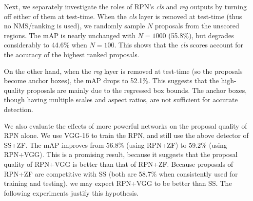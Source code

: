 \documentclass[10pt,journal,cspaper,compsoc]{IEEEtran}
\begin{document}
Next, we separately investigate the roles of RPN's \emph{cls} and \emph{reg} outputs by turning off either of them at test-time.
When the \emph{cls} layer is removed at test-time (thus no NMS/ranking is used), we randomly sample $N$ proposals from the unscored regions. The mAP is nearly unchanged with $N=1000$ (55.8\%), but degrades considerably to 44.6\% when $N=100$. This shows that the \emph{cls} scores account for the accuracy of the highest ranked proposals.

On the other hand, when the \emph{reg} layer is removed at test-time (so the proposals become anchor boxes), the mAP drops to 52.1\%. This suggests that the high-quality proposals are mainly due to the regressed box bounds. The anchor boxes, though having multiple scales and aspect ratios, are not sufficient for accurate detection.

We also evaluate the effects of more powerful networks on the proposal quality of RPN alone. We use VGG-16 to train the RPN, and still use the above detector of SS+ZF. The mAP improves from 56.8\% (using RPN+ZF) to 59.2\% (using RPN+VGG).
This is a promising result, because it suggests that the proposal quality of RPN+VGG is better than that of RPN+ZF. Because proposals of RPN+ZF are competitive with SS (both are 58.7\% when consistently used for training and testing), we may expect RPN+VGG to be better than SS. The following experiments justify this hypothesis.
\end{document}
